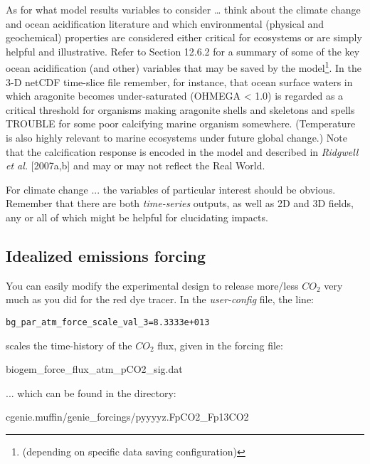 \documentclass[11pt,fleqn]{book} %
\begin{document}
As for what model results variables to consider … think about the climate change and ocean acidification literature and which environmental (physical and geochemical) properties are considered either critical for ecosystems or are simply helpful and illustrative. Refer to Section 12.6.2 for a summary of some of the key ocean acidification (and other) variables that may be saved by the model\footnote{(depending on specific data saving configuration)}.
In the 3-D netCDF time-slice file remember, for instance, that ocean surface waters in which aragonite becomes under-saturated (OHMEGA < 1.0) is regarded as a critical threshold for organisms making aragonite shells and skeletons and spells TROUBLE for some poor calcifying marine organism somewhere. (Temperature is also highly relevant to marine ecosystems under future global change.) Note that the calcification response is encoded in the model and described in \textit{Ridgwell et al.} [2007a,b] and may or may not reflect the Real World.

For climate change ... the variables of particular interest should be obvious. Remember that there are both \textit{time-series} outputs, as well as  2D and 3D fields, any or all of which might be  helpful for elucidating impacts.


\subsection{Idealized emissions forcing}

\noindent You can easily modify the experimental design to release more/less \(CO_{2}\) very much as you did for the red dye tracer. In the \textit{user-config} file, the line:
\vspace{-2pt}\begin{verbatim}
bg_par_atm_force_scale_val_3=8.3333e+013
\end{verbatim}\vspace{-2pt}
scales the time-history of the  \(CO_{2}\) flux, given in the forcing file:

\vspace{2pt}
\noindent \footnotesize\textsf{biogem\_force\_flux\_atm\_pCO2\_sig.dat}\normalsize
\vspace{2pt}

\noindent ... which can be found in the directory:

\vspace{2pt}
\noindent \footnotesize\textsf{cgenie.muffin/genie\_forcings/pyyyyz.FpCO2\_Fp13CO2}\normalsize
\vspace{2pt}
\end{document}
